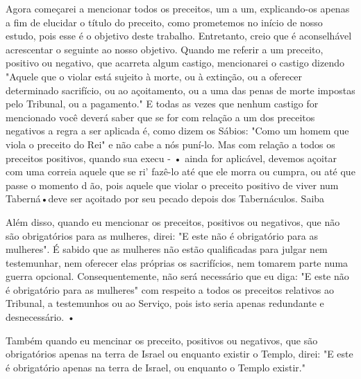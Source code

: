 \begin{itemize}
\begin{enumrate}
\begin{itemize}
Agora começarei a mencionar todos os preceitos, um a um, expli­cando-os
apenas a fim de elucidar o título do preceito, como prometemos no início
de nosso estudo, pois esse é o objetivo deste trabalho. Entretanto,
creio que é aconselhável acrescentar o seguinte ao nosso objetivo.
Quando me refe­rir a um preceito, positivo ou negativo, que acarreta
algum castigo, menciona­rei o castigo dizendo "Aquele que o violar está
sujeito à morte, ou à extinção, ou a oferecer determinado sacrifício, ou
ao açoitamento, ou a uma das penas de morte impostas pelo Tribunal, ou a
pagamento." E todas as vezes que ne­nhum castigo for mencionado você
deverá saber que se for com relação a um dos preceitos negativos a regra
a ser aplicada é, como dizem os Sábios: "Como um homem que viola o
preceito do Rei" e não cabe a nós puní-lo. Mas com relação a todos os
preceitos positivos, quando sua execu - • ainda for aplicável, 
devemos açoitar com uma correia aquele que se ri' fazê-lo até que
ele morra ou cumpra, ou até que passe o momento d ão, pois aquele
que violar o preceito positivo de viver num Taberná•deve ser açoi­tado
por seu pecado depois dos Tabernáculos. Saiba

Além disso, quando eu mencionar os preceitos, positivos ou negati­vos,
que não são obrigatórios para as mulheres, direi: "E este não é
obrigatório para as mulheres". É sabido que as mulheres não estão
qualificadas para julgar nem testemunhar, nem oferecer elas próprias os
sacrifícios, nem tomarem par­te numa guerra opcional. Consequentemente,
não será necessário que eu diga: "E este não é obrigatório para as
mulheres" com respeito a todos os preceitos relativos ao Tribunal, a
testemunhos ou ao Serviço, pois isto seria apenas re­dundante e
desnecessário. •

Também quando eu mencinar os preceito, positivos ou negativos, que são
obrigatórios apenas na terra de Israel ou enquanto existir o Templo,
direi: "E este é obrigatório apenas na terra de Israel, ou enquanto o
Templo existir."


\end{itemize}
\end{enumrate}
\end{itemize}
